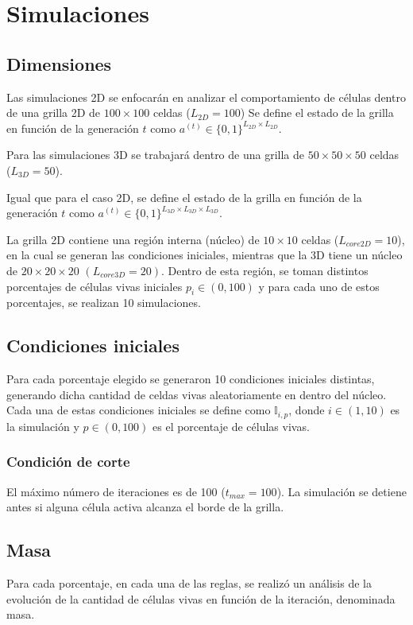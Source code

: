 \section{Simulaciones}
\label{sec:simulaciones}

\subsection{Dimensiones}
\label{subsec:acdim}
Las simulaciones 2D se enfocarán en analizar el comportamiento de células dentro de una grilla 2D de $100 \times 100$ celdas ($L_{2D} = 100$)
Se define el estado de la grilla en función de la generación $t$ como $a^{(t)} \in \{0,1\}^{L_{2D}\times L_{2D}}$.

Para las simulaciones 3D se trabajará dentro de una grilla de $50 \times 50 \times 50$ celdas ($L_{3D} = 50$).

Igual que para el caso 2D, se define el estado de la grilla en función de la generación $t$ como $a^{(t)} \in \{0,1\}^{L_{3D}\times L_{3D} \times L_{3D}}$.

La grilla 2D contiene una región interna (núcleo) de $10 \times 10$ celdas ($L_{core2D} = 10$), en la cual se generan las condiciones iniciales,
mientras que la 3D tiene un núcleo de $20 \times 20 \times 20$ $(L_{core3D} = 20)$.
Dentro de esta región, se toman distintos porcentajes de células vivas iniciales $p_i \in (0, 100)$ y para cada uno de estos porcentajes, se realizan 10 simulaciones.

\subsection{Condiciones iniciales}
\label{subsec:acini}
Para cada porcentaje elegido se generaron 10 condiciones iniciales distintas, generando dicha cantidad de celdas vivas aleatoriamente en dentro del núcleo.
Cada una de estas condiciones iniciales se define como $\mathbb{I}_{i,p}$, donde $i \in (1, 10)$ es la simulación y $p \in (0, 100)$ es el porcentaje de células vivas.

\subsubsection{Condición de corte}
\label{subsubsec:ac2corte}
El máximo número de iteraciones es de 100 ($t_{max} = 100$).
La simulación se detiene antes si alguna célula activa alcanza el borde de la grilla.

\subsection{Masa}
Para cada porcentaje, en cada una de las reglas, se realizó un análisis de la evolución de la cantidad de células vivas en función de la iteración, denominada masa.

